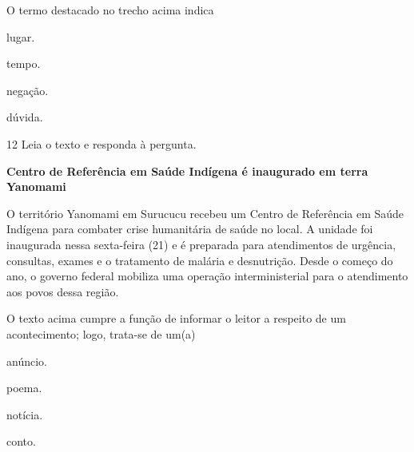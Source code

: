 \begin{myquote}
\begin{myescolha}
\begin{myquote}
\end{myquote}

O termo destacado no trecho acima indica

\begin{escolha}
  \item lugar.

  \item tempo.

  \item negação.

  \item dúvida.
\end{escolha}

\num{12} Leia o texto e responda à pergunta.

\begin{myquote}
\textbf{Centro de Referência em Saúde Indígena é inaugurado em terra
Yanomami}

O território Yanomami em Surucucu recebeu um Centro de Referência em
Saúde Indígena para combater crise humanitária de saúde no local. A
unidade foi inaugurada nessa sexta-feira (21) e é preparada para
atendimentos de urgência, consultas, exames e o tratamento de malária e
desnutrição. Desde o começo do ano, o governo federal mobiliza uma
operação interministerial para o atendimento aos povos dessa região.

\end{myquote}

O texto acima cumpre a função de informar o leitor a respeito de um
acontecimento; logo, trata-se de um(a)

\begin{escolha}
  \item anúncio.

  \item poema.

  \item notícia.

  \item conto.
\end{escolha}


\end{myescolha}
\end{myquote}
